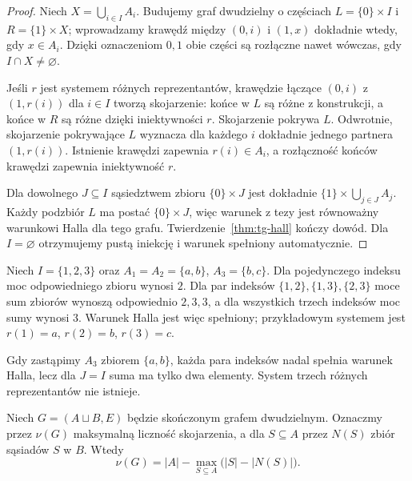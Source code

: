 \begin{proof}
Niech $X=\bigcup_{i\in I}A_i$. Budujemy graf dwudzielny
o częściach $L=\{0\}\times I$ i $R=\{1\}\times X$;
wprowadzamy krawędź między $(0,i)$ i $(1,x)$
dokładnie wtedy, gdy $x\in A_i$. Dzięki oznaczeniom
$0,1$ obie części są rozłączne nawet wówczas,
gdy $I\cap X\ne\varnothing$.

Jeśli $r$ jest systemem różnych reprezentantów,
krawędzie łączące $(0,i)$ z $(1,r(i))$ dla $i\in I$
tworzą skojarzenie: końce w $L$ są różne z konstrukcji,
a końce w $R$ są różne dzięki iniektywności $r$.
Skojarzenie pokrywa $L$. Odwrotnie, skojarzenie
pokrywające $L$ wyznacza dla każdego $i$ dokładnie
jednego partnera $(1,r(i))$. Istnienie krawędzi
zapewnia $r(i)\in A_i$, a rozłączność końców
krawędzi zapewnia iniektywność $r$.

Dla dowolnego $J\subseteq I$ sąsiedztwem zbioru
$\{0\}\times J$ jest dokładnie
$\{1\}\times\bigcup_{j\in J}A_j$.
Każdy podzbiór $L$ ma postać $\{0\}\times J$,
więc warunek z tezy jest równoważny warunkowi Halla
dla tego grafu. Twierdzenie~\ref{thm:tg-hall}
kończy dowód. Dla $I=\varnothing$ otrzymujemy
pustą iniekcję i warunek spełniony automatycznie.
\end{proof}

\begin{przyklad}
Niech $I=\{1,2,3\}$ oraz $A_1=A_2=\{a,b\}$,
$A_3=\{b,c\}$. Dla pojedynczego indeksu moc
odpowiedniego zbioru wynosi $2$. Dla par indeksów
$\{1,2\},\{1,3\},\{2,3\}$ moce sum zbiorów
wynoszą odpowiednio $2,3,3$, a dla wszystkich
trzech indeksów moc sumy wynosi $3$.
Warunek Halla jest więc spełniony; przykładowym
systemem jest $r(1)=a$, $r(2)=b$, $r(3)=c$.

Gdy zastąpimy $A_3$ zbiorem $\{a,b\}$, każda
para indeksów nadal spełnia warunek Halla,
lecz dla $J=I$ suma ma tylko dwa elementy.
System trzech różnych reprezentantów nie istnieje.
\end{przyklad}

\begin{stwierdzenie}
\label{prop:tg-hall-def}
Niech $G=(A\sqcup B,E)$ będzie skończonym grafem
dwudzielnym. Oznaczmy przez $\nu(G)$ maksymalną
liczność skojarzenia, a dla $S\subseteq A$ przez $N(S)$
zbiór sąsiadów $S$ w $B$. Wtedy
\[
\nu(G)=|A|-\max_{S\subseteq A}\bigl(|S|-|N(S)|\bigr).
\]
\end{stwierdzenie}

